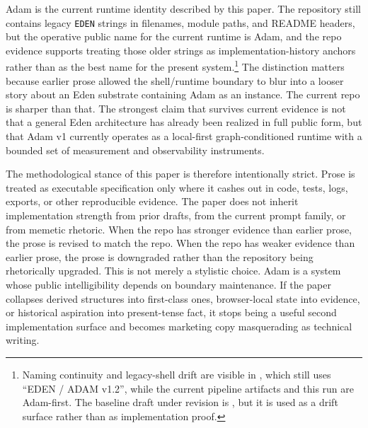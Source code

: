 \documentclass[10pt]{article}
\begin{document}
Adam is the current runtime identity described by this paper. The repository still contains legacy \texttt{EDEN} strings in filenames, module paths, and README headers, but the operative public name for the current runtime is Adam, and the repo evidence supports treating those older strings as implementation-history anchors rather than as the best name for the present system.\footnote{Naming continuity and legacy-shell drift are visible in , which still uses ``EDEN / ADAM v1.2'', while the current pipeline artifacts and this run are Adam-first. The baseline draft under revision is , but it is used as a drift surface rather than as implementation proof.} The distinction matters because earlier prose allowed the shell/runtime boundary to blur into a looser story about an Eden substrate containing Adam as an instance. The current repo is sharper than that. The strongest claim that survives current evidence is not that a general Eden architecture has already been realized in full public form, but that Adam v1 currently operates as a local-first graph-conditioned runtime with a bounded set of measurement and observability instruments.

The methodological stance of this paper is therefore intentionally strict. Prose is treated as executable specification only where it cashes out in code, tests, logs, exports, or other reproducible evidence. The paper does not inherit implementation strength from prior drafts, from the current prompt family, or from memetic rhetoric. When the repo has stronger evidence than earlier prose, the prose is revised to match the repo. When the repo has weaker evidence than earlier prose, the prose is downgraded rather than the repository being rhetorically upgraded. This is not merely a stylistic choice. Adam is a system whose public intelligibility depends on boundary maintenance. If the paper collapses derived structures into first-class ones, browser-local state into evidence, or historical aspiration into present-tense fact, it stops being a useful second implementation surface and becomes marketing copy masquerading as technical writing.
\end{document}
